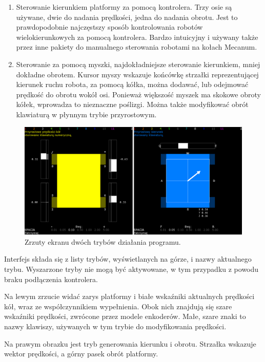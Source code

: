 \begin{enumerate}
			\item Sterowanie kierunkiem platformy za pomocą kontrolera. Trzy osie są używane, dwie do nadania prędkości, jedna do nadania obrotu.
			Jest to prawdopodobnie najczęstszy sposób kontrolowania robotów wielokierunkowych za pomocą kontrolera.
			Bardzo intuicyjny i używany także przez inne pakiety do manualnego sterowania robotami na kołach Mecanum.
			\item Sterowanie za pomocą myszki, najdokładniejsze sterowanie kierunkiem, mniej dokładne obrotem.
			Kursor myszy wskazuje końcówkę strzałki reprezentującej kierunek ruchu robota, za pomocą kółka, można dodawać, lub odejmować prędkość do obrotu wokół osi.
			Ponieważ większość myszek ma skokowe obroty kółek, wprowadza to nieznaczne poślizgi. Można także modyfikować obrót klawiaturą w płynnym trybie przyrostowym.
		\end{enumerate}
		
		\begin{figure}[H]
		\centering
		\includegraphics[width=\textwidth]{graphics/lalkarz.png}
		\caption{Zrzuty ekranu dwóch trybów działania programu.}
		\label{fig:lalkarz}
		\end{figure}
		
		Interfejs składa się z listy trybów, wyświetlanych na górze, i nazwy aktualnego trybu.
		Wyszarzone tryby nie mogą być aktywowane, w tym przypadku z powodu braku podłączenia kontrolera.
		
		Na lewym zrzucie widać zarys platformy i białe wskaźniki aktualnych prędkości kół, wraz ze współczynnikiem wypełnienia.
		Obok nich znajdują się szare wskaźniki prędkości, zwrócone przez modele enkoderów.
		Małe, szare znaki to nazwy klawiszy, używanych w tym trybie do modyfikowania prędkości.
		
		Na prawym obrazku jest tryb generowania kierunku i obrotu. Strzałka wskazuje wektor prędkości, a górny pasek obrót platformy.
		
